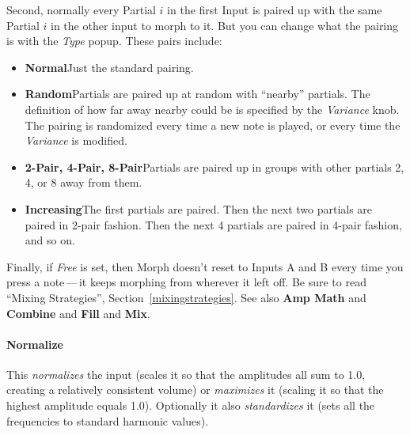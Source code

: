 \documentclass{article}
\begin{document}
Second, normally every Partial \(i\) in the first Input is paired up with the same Partial \(i\) in the other input to morph to it.  But you can change what the pairing is with the {\it Type} popup.  These pairs include:

\begin{itemize}
\item {\bf Normal}\qquad Just the standard pairing.
\item {\bf Random}\qquad Partials are paired up at random with ``nearby'' partials.  The definition of how far away nearby could be is specified by the {\it Variance} knob.  The pairing is randomized every time a new note is played, or every time the {\it Variance} is modified.
\item {\bf 2-Pair, 4-Pair, 8-Pair}\qquad Partials are paired up in groups with other partials 2, 4, or 8 away from them.
\item {\bf Increasing}\qquad The first partials are paired.  Then the next two partials are paired in 2-pair fashion.  Then the next 4 partials are paired in 4-pair fashion, and so on.
\end{itemize}



Finally, if {\it Free} is set, then Morph doesn't reset to Inputs A and B every time you press a note\,---\,it keeps morphing from wherever it left off.  Be sure to read ``Mixing Strategies'', Section~\ref{mixingstrategies}.  See also {\bf Amp Math} and  {\bf Combine} and {\bf Fill} and {\bf Mix}.

\paragraph{Normalize} This {\it normalizes} the input (scales it so that the amplitudes all sum to 1.0, creating a relatively consistent volume) or {\it maximizes} it (scaling it so that the highest amplitude equals 1.0).  Optionally it also {\it standardizes} it (sets all the frequencies to standard harmonic values).
\end{document}
